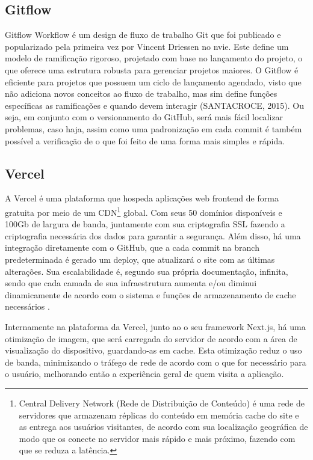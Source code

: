 \subsection{Gitflow}
Gitflow Workflow é um design de fluxo de trabalho Git que foi publicado e popularizado pela primeira vez por Vincent Driessen no nvie. Este define um modelo de ramificação rigoroso, projetado com base no lançamento do projeto, o que oferece uma estrutura robusta para gerenciar projetos maiores. O Gitflow é eficiente para projetos que possuem um ciclo de lançamento agendado, visto que não adiciona novos conceitos ao fluxo de trabalho, mas sim define funções específicas as ramificações e quando devem interagir (SANTACROCE, 2015). Ou seja, em conjunto com o versionamento do GitHub, será mais fácil localizar problemas, caso haja, assim como uma padronização em cada commit é também possível a verificação de o que foi feito de uma forma mais simples e rápida.

\subsection{Vercel}
A Vercel é uma plataforma que hospeda aplicações web frontend de forma gratuita por meio de um CDN\footnote{Central Delivery Network (Rede de Distribuição de Conteúdo) é uma rede de servidores que armazenam réplicas do conteúdo em memória cache do site e as entrega aos usuários visitantes, de acordo com sua localização geográfica de modo que os conecte no servidor mais rápido e mais próximo, fazendo com que se reduza a latência.}
global. Com seus 50 domínios disponíveis e 100Gb de largura de banda, juntamente com sua criptografia SSL fazendo a criptografia necessária dos dados para garantir a segurança. Além disso, há uma integração diretamente com o GitHub, que a cada commit na branch predeterminada é gerado um deploy, que atualizará o site com as últimas alterações. Sua escalabilidade é, segundo sua própria documentação, infinita, sendo que cada camada de sua infraestrutura aumenta e/ou diminui dinamicamente de acordo com o sistema e funções de armazenamento de cache necessários \cite{VERCEL}. 

Internamente na plataforma da Vercel, junto ao o seu framework Next.js, há uma otimização de imagem, que será carregada do servidor de acordo com a área de visualização do dispositivo, guardando-as em cache. Esta otimização reduz o uso de banda, minimizando o tráfego de rede de acordo com o que for necessário para o usuário, melhorando então a experiência geral de quem visita a aplicação.

